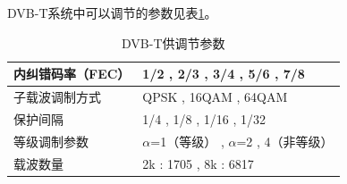 		\par DVB-T系统中可以调节的参数见表\ref{table:params_of_dvbt}。
		\begin{table}[!htbp]
			\centering
			\caption{DVB-T供调节参数}
			\begin{tabular}{|l|p{}|}
				\hline\hline
				内纠错码率（FEC） & 1/2 , 2/3 , 3/4 , 5/6 , 7/8                            \\
				\hline
				子载波调制方式    & QPSK , 16QAM , 64QAM                                   \\
				\hline
				保护间隔             & 1/4 , 1/8 , 1/16 , 1/32                                \\
				\hline
				等级调制参数       & $\alpha$=1（等级） , $\alpha$=2 , 4（非等级） \\
				\hline
				载波数量             & 2k : 1705 , 8k : 6817                                  \\
				\hline\hline
			\end{tabular}
			\label{table:params_of_dvbt}
		\end{table}
		\endinput